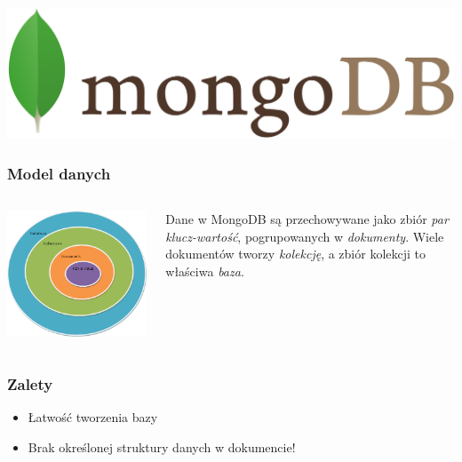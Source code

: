 \documentclass{beamer}
\author{Dawid Czech, Marcin Radomski}
\title{}
\begin{document}
  \begin{frame}
    \includegraphics[width=\textwidth,keepaspectratio]{img/logo.png}
    \maketitle
  \end{frame}

  \begin{frame}
    \frametitle{Model danych}
    \begin{columns}
      \includegraphics[scale=0.5]{img/db-structure.png}

      Dane w MongoDB są przechowywane jako zbiór \emph{par klucz-wartość}, pogrupowanych w \emph{dokumenty}. Wiele dokumentów tworzy \emph{kolekcję}, a zbiór kolekcji to właściwa \emph{baza}.
    \end{columns}
  \end{frame}

  \begin{frame}
    \frametitle{Zalety}
    \begin{itemize}
      \item Łatwość tworzenia bazy
      \item Brak określonej struktury danych w dokumencie!
    \end{itemize}
  \end{frame}
\end{document}
